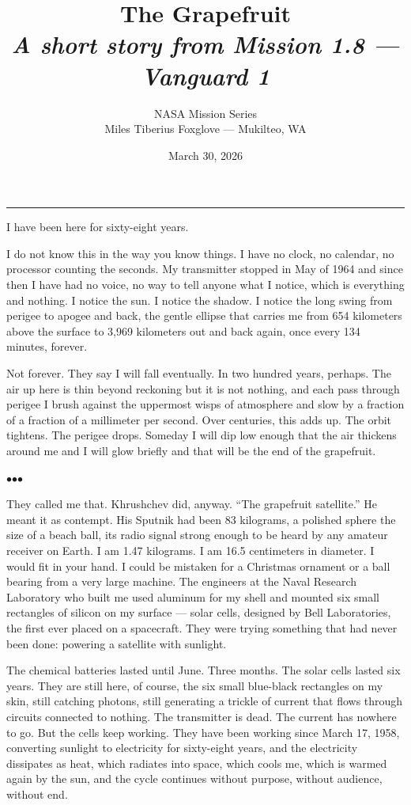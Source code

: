 \documentclass[12pt, letterpaper]{article}
\title{\Huge\textbf{The Grapefruit}\\[0.5em]\large\textit{A short story from Mission 1.8 --- Vanguard 1}}
\author{NASA Mission Series\\[0.3em]\small Miles Tiberius Foxglove --- Mukilteo, WA}
\date{March 30, 2026}
\begin{document}
\maketitle
\thispagestyle{empty}

\vspace{1em}
\noindent\rule{\textwidth}{0.4pt}
\vspace{1em}

\noindent I have been here for sixty-eight years.

I do not know this in the way you know things. I have no clock, no calendar, no processor counting the seconds. My transmitter stopped in May of 1964 and since then I have had no voice, no way to tell anyone what I notice, which is everything and nothing. I notice the sun. I notice the shadow. I notice the long swing from perigee to apogee and back, the gentle ellipse that carries me from 654 kilometers above the surface to 3,969 kilometers out and back again, once every 134 minutes, forever.

Not forever. They say I will fall eventually. In two hundred years, perhaps. The air up here is thin beyond reckoning but it is not nothing, and each pass through perigee I brush against the uppermost wisps of atmosphere and slow by a fraction of a fraction of a millimeter per second. Over centuries, this adds up. The orbit tightens. The perigee drops. Someday I will dip low enough that the air thickens around me and I will glow briefly and that will be the end of the grapefruit.

\bigskip
\centerline{$\bullet$\quad$\bullet$\quad$\bullet$}
\bigskip

They called me that. Khrushchev did, anyway. ``The grapefruit satellite.'' He meant it as contempt. His Sputnik had been 83 kilograms, a polished sphere the size of a beach ball, its radio signal strong enough to be heard by any amateur receiver on Earth. I am 1.47 kilograms. I am 16.5 centimeters in diameter. I would fit in your hand. I could be mistaken for a Christmas ornament or a ball bearing from a very large machine. The engineers at the Naval Research Laboratory who built me used aluminum for my shell and mounted six small rectangles of silicon on my surface --- solar cells, designed by Bell Laboratories, the first ever placed on a spacecraft. They were trying something that had never been done: powering a satellite with sunlight.

The chemical batteries lasted until June. Three months. The solar cells lasted six years. They are still here, of course, the six small blue-black rectangles on my skin, still catching photons, still generating a trickle of current that flows through circuits connected to nothing. The transmitter is dead. The current has nowhere to go. But the cells keep working. They have been working since March 17, 1958, converting sunlight to electricity for sixty-eight years, and the electricity dissipates as heat, which radiates into space, which cools me, which is warmed again by the sun, and the cycle continues without purpose, without audience, without end.
\end{document}

